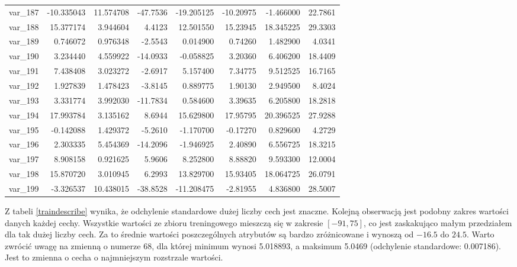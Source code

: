 \documentclass[12pt]{article}
\begin{document}
\begin{longtable}{lrrrrrrr}
 var\_187 & -10.335043 &  11.574708 & -47.7536 & -19.205125 & -10.20975 &  -1.466000 &  22.7861 \\
 var\_188 &  15.377174 &   3.944604 &   4.4123 &  12.501550 &  15.23945 &  18.345225 &  29.3303 \\
 var\_189 &   0.746072 &   0.976348 &  -2.5543 &   0.014900 &   0.74260 &   1.482900 &   4.0341 \\
 var\_190 &   3.234440 &   4.559922 & -14.0933 &  -0.058825 &   3.20360 &   6.406200 &  18.4409 \\
 var\_191 &   7.438408 &   3.023272 &  -2.6917 &   5.157400 &   7.34775 &   9.512525 &  16.7165 \\
 var\_192 &   1.927839 &   1.478423 &  -3.8145 &   0.889775 &   1.90130 &   2.949500 &   8.4024 \\
 var\_193 &   3.331774 &   3.992030 & -11.7834 &   0.584600 &   3.39635 &   6.205800 &  18.2818 \\
 var\_194 &  17.993784 &   3.135162 &   8.6944 &  15.629800 &  17.95795 &  20.396525 &  27.9288 \\
 var\_195 &  -0.142088 &   1.429372 &  -5.2610 &  -1.170700 &  -0.17270 &   0.829600 &   4.2729 \\
 var\_196 &   2.303335 &   5.454369 & -14.2096 &  -1.946925 &   2.40890 &   6.556725 &  18.3215 \\
 var\_197 &   8.908158 &   0.921625 &   5.9606 &   8.252800 &   8.88820 &   9.593300 &  12.0004 \\
 var\_198 &  15.870720 &   3.010945 &   6.2993 &  13.829700 &  15.93405 &  18.064725 &  26.0791 \\
 var\_199 &  -3.326537 &  10.438015 & -38.8528 & -11.208475 &  -2.81955 &   4.836800 &  28.5007 \\
\end{longtable}

Z tabeli \ref{traindescribe} wynika, że odchylenie standardowe dużej liczby cech jest znaczne. Kolejną obserwacją jest podobny zakres wartości danych każdej cechy. Wszystkie wartości ze zbioru treningowego mieszczą się w zakresie $[-91, 75]$, co jest zaskakująco małym przedziałem dla tak dużej liczby cech. Za to średnie wartości poszczególnych atrybutów są bardzo zróżnicowane i wynoszą od $-16.5$ do $24.5$. Warto zwrócić uwagę na zmienną o numerze $68$, dla której minimum wynosi 5.018893, a maksimum 5.0469 (odchylenie standardowe: 0.007186). Jest to zmienna o cecha o najmniejszym rozstrzale wartości.
\newline 
\end{document}
